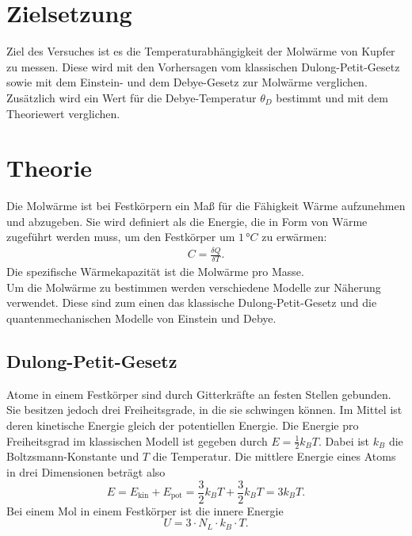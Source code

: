 \section{Zielsetzung}
\label{sec:Zielsetzung}

Ziel des Versuches ist es die Temperaturabhängigkeit der Molwärme von Kupfer zu messen. Diese wird mit den Vorhersagen 
vom klassischen Dulong-Petit-Gesetz sowie mit dem Einstein- und dem Debye-Gesetz zur Molwärme verglichen. Zusätzlich wird ein Wert für die Debye-Temperatur $\theta_D$ bestimmt und mit dem Theoriewert verglichen.


\section{Theorie}
\label{sec:Theorie}
Die Molwärme ist bei Festkörpern ein Maß für die Fähigkeit Wärme aufzunehmen und abzugeben. Sie wird definiert als die Energie, die in Form von Wärme zugeführt werden muss, 
um den Festkörper um $1\,\si{°C}$ zu erwärmen: 
\begin{align*}
    C = \frac{\delta Q}{\delta T}.
\end{align*}
Die spezifische Wärmekapazität ist die Molwärme pro Masse.\\
Um die Molwärme zu bestimmen werden verschiedene Modelle zur Näherung verwendet. Diese sind zum einen das klassische Dulong-Petit-Gesetz und die quantenmechanischen 
Modelle von Einstein und Debye. 
\subsection{Dulong-Petit-Gesetz}
\label{sec:dulongpetit}

Atome in einem Festkörper sind durch Gitterkräfte an festen Stellen gebunden. Sie besitzen jedoch drei Freiheitsgrade, in die sie schwingen können. 
Im Mittel ist deren kinetische Energie gleich der potentiellen Energie. Die Energie pro Freiheitsgrad im klassischen Modell ist gegeben durch 
$E = \frac{1}{2}k_B T$. Dabei ist $k_B$ die Boltzsmann-Konstante und $T$ die Temperatur. Die mittlere Energie eines Atoms in drei Dimensionen beträgt also 
\begin{equation}
    E = E_{\text{kin}} + E_{\text{pot}} = \frac{3}{2}k_B T + \frac{3}{2}k_B T = 3k_B T.
\end{equation}
Bei einem Mol in einem Festkörper ist die innere Energie 
\begin{equation}
    U = 3 \cdot N_L\cdot k_B \cdot T.
\end{equation}

